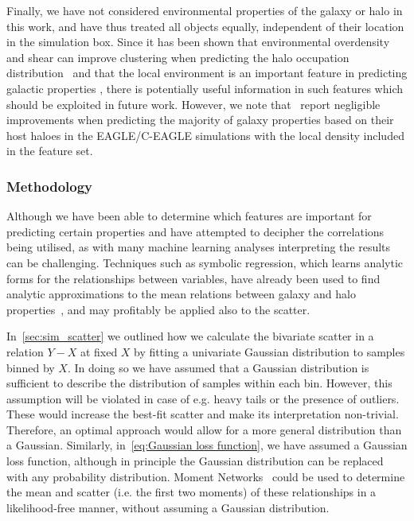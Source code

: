 \documentclass[useAMS,usenatbib]{mnras}
\begin{document}
Finally, we have not considered environmental properties of the galaxy or halo in this work, and have thus treated all objects equally, independent of their location in the simulation box. Since it has been shown that environmental overdensity and shear can improve clustering when predicting the halo occupation distribution~\citep{Delgado_2021} and that the local environment is an important feature in predicting galactic properties \citep{Agarwal_2018}, there is potentially useful information in such features which should be exploited in future work. However, we note that~\cite{Lovell_2021} report negligible improvements when predicting the majority of galaxy properties based on their host haloes in the EAGLE/C-EAGLE simulations with the local density included in the feature set.

\subsubsection{Methodology}

Although we have been able to determine which features are important for predicting certain properties and have attempted to decipher the correlations being utilised, as with many machine learning analyses interpreting the results can be challenging. Techniques such as symbolic regression, which learns analytic forms for the relationships between variables, have already been used to find analytic approximations to the mean relations between galaxy and halo properties~\citep{Shao_2021,Delgado_2021}, and may profitably be applied also to the scatter.

In~\cref{sec:sim_scatter} we outlined how we calculate the bivariate scatter in a relation $Y-X$ at fixed $X$ by fitting a univariate Gaussian distribution to samples binned by $X$. In doing so we have assumed that a Gaussian distribution is sufficient to describe the distribution of samples within each bin. However, this assumption will be violated in case of e.g. heavy tails or the presence of outliers. These would increase the best-fit scatter and make its interpretation non-trivial. Therefore, an optimal approach would allow for a more general distribution than a Gaussian. Similarly, in~\cref{eq:Gaussian loss function}, we have assumed a Gaussian loss function, although in principle the Gaussian distribution can be replaced with any probability distribution. Moment Networks~\citep{Jeffrey_2020} could be used to determine the mean and scatter (i.e. the first two moments) of these relationships in a likelihood-free manner, without assuming a Gaussian distribution.
\end{document}
